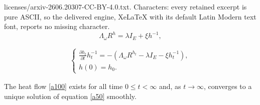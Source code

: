 \documentclass[10pt,a4paper]{amsart}
\newcommand{\lb}{\left (}
\newcommand{\pa}{\partial}
\newcommand{\rb}{\right )}
\begin{document}
licenses/arxiv-2606.20307-CC-BY-4.0.txt. Characters: every retained excerpt is pure ASCII, so the delivered engine, XeLaTeX with its default Latin Modern text font, reports no missing character.
\begin{equation}\label{a50}
\Lambda_\omega R^h=\lambda I_E+\xi h^{-1},
\end{equation}

\begin{eqnarray}\label{a100}
\begin{cases}
\frac{\pa h_t}{\pa t}h_t^{-1}=-\lb \Lambda_\omega R^{h_t}-\lambda I_E-\xi h_t^{-1}\rb,\\
h(0)=h_0.
\end{cases}
\end{eqnarray}

\begin{theorem}\label{a105}
The heat flow \eqref{a100} exists for all time $0\leq t <\infty$ and, as $t\to\infty$, converges to a unique solution of equation \eqref{a50} smoothly.
\end{theorem}
\end{document}
